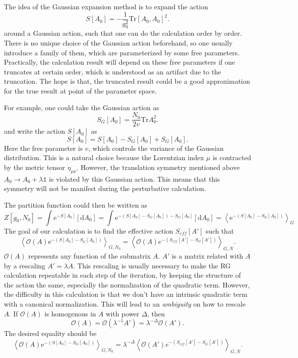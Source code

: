 
The idea of the Gaussian expansion method is to expand the action
\[
	S[A_0] = -\frac{1}{g_0^2} \mathrm{Tr}[A_0,A_0]^2
.\] 
around a Gaussian action,
such that one can do the calculation order by order.
There is no unique choice of the Gaussian action beforehand,
so one usually introduce a family of them,
which are parameterized by some free parameters.
Practically,
the calculation result will depend on these free parameters
if one truncates at certain order,
which is understood as an artifact due to the truncation.
The hope is that,
the truncated result could be a good approximation for the true result
at point of the parameter space.

For example, one could take the Gaussian action as
\[
	S_G[A_0] = \frac{N_0}{2v} \mathrm{Tr}A_0^2
.\] 
and write the action $S[A_0]$ as
\[
	S[A_0] = S[A_0] - S_G[A_0] + S_G[A_0]
.\] 
Here the free parameter is $v$,
which controls the variance of the Gaussian distribution.
This is a natural choice because the Lorentzian index $\mu$
is contracted by the metric tensor $\eta_{\mu\nu}$.
However, the translation symmetry mentioned above
$A_0 \to A_0 + \lambda \mathds{1}$
is violated by this Gaussian action.
This means that this symmetry will not be manifest
during the perturbative calculation.

The partition function could then be written as
\begin{equation}
	Z[g_0,N_0] = \int \mathrm{e}^{-S[A_0]} [\mathrm{d}A_0]
	= \int \mathrm{e}^{-(S[A_0] - S_G[A_0])-S_G[A_0]} [\mathrm{d}A_0]
	= \left<\mathrm{e}^{-(S[A_0] - S_G[A_0])} \right>_G
\end{equation}
The goal of our calculation is to find the effective action
$S_{eff}[A']$
such that
\[
	\left<\mathcal{O}(A)\mathrm{e}^{-(S[A_0] - S_G[A_0])} \right>_{G,N_0} = 
	\left<\mathcal{O}(A) e^{-(S_{eff}[A'] - S_G[A'])} \right>_{G,N}
.\] 
$\mathcal{O}(A)$ represents any function of the submatrix $A$.
$A'$ is a matrix related with $A$ by a rescaling $A' = \lambda A$.
This rescaling is usually necessary to make the RG calculation repeatable
in each step of the iteration,
by keeping the structure of the action the same,
especially the normalization of the quadratic term.
However, the difficulty in this calculation is that
we don't have an intrinsic quadratic term with a canonical normalization.
This will lead to an \emph{ambiguity} on how to rescale $A$.
If $\mathcal{O}(A)$ is homogenous in $A$ with power $\Delta$, then
\[
	\mathcal{O}(A) = \mathcal{O}(\lambda^{-1} A')
	= \lambda^{-\Delta} \mathcal{O}(A')
.\] 
The desired equality should be
\[
	\left<\mathcal{O}(A)\mathrm{e}^{-(S[A_0] - S_G[A_0])} \right>_{G,N_0} = 
	\lambda^{-\Delta}
	\left<\mathcal{O}(A') e^{-(S_{eff}[A'] - S_G[A'])} \right>_{G,N}
.\] 

